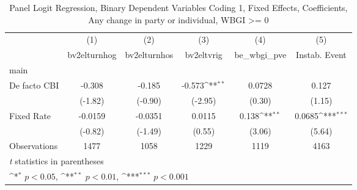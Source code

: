 \begin{table}[htbp]\centering
\def\sym#1{\ifmmode^{#1}\else\(^{#1}\)\fi}
\caption{Panel Logit Regression, Binary Dependent Variables Coding 1, Fixed Effects, Coefficients, Any change in party or individual, WBGI >= 0 \label{logitFEMultIndDF}}
\begin{tabular}{l*{5}{c}}
\toprule
                                        &\multicolumn{1}{c}{(1)}&\multicolumn{1}{c}{(2)}&\multicolumn{1}{c}{(3)}&\multicolumn{1}{c}{(4)}&\multicolumn{1}{c}{(5)}\\
                                        &\multicolumn{1}{c}{bv2elturnhog}&\multicolumn{1}{c}{bv2elturnhos}&\multicolumn{1}{c}{bv2eltvrig}&\multicolumn{1}{c}{be\_wbgi\_pve}&\multicolumn{1}{c}{Instab. Event}\\
\midrule
main                                    &                  &                  &                  &                  &                  \\
De facto CBI                            &   -0.308         &   -0.185         &   -0.573\sym{**} &   0.0728         &    0.127         \\
                                        &  (-1.82)         &  (-0.90)         &  (-2.95)         &   (0.30)         &   (1.15)         \\
\addlinespace
Fixed Rate                              &  -0.0159         &  -0.0351         &   0.0115         &    0.138\sym{**} &   0.0685\sym{***}\\
                                        &  (-0.82)         &  (-1.49)         &   (0.55)         &   (3.06)         &   (5.64)         \\
\midrule
Observations                            &     1477         &     1058         &     1229         &     1119         &     4163         \\
\bottomrule
\multicolumn{6}{l}{\footnotesize \textit{t} statistics in parentheses}\\
\multicolumn{6}{l}{\footnotesize \sym{*} \(p<0.05\), \sym{**} \(p<0.01\), \sym{***} \(p<0.001\)}\\
\end{tabular}
\end{table}
